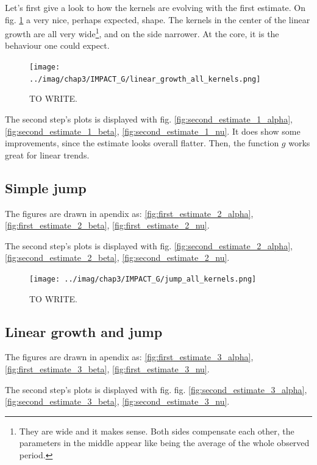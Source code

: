 \documentclass[11pt]{book}
\begin{document}
Let's first give a look to how the kernels are evolving with the first estimate. On fig. \ref{fig:impact_g_linear} a very nice, perhaps expected, shape. The kernels in the center of the linear growth are all very wide\footnote{They are wide and it makes sense. Both sides compensate each other, the parameters in the middle appear like being the average of the whole observed period.}, and on the side narrower. At the core, it is the behaviour one could expect.

\begin{figure}
\centering
\texttt{[image: ../imag/chap3/IMPACT\_G/linear\_growth\_all\_kernels.png]}
\caption{TO WRITE.}
\label{fig:impact_g_linear}
\end{figure}


The second step's plots is displayed with fig. \ref{fig:second_estimate_1_alpha}, \ref{fig:second_estimate_1_beta}, \ref{fig:second_estimate_1_nu}. It does show some improvements, since the estimate looks overall flatter. Then, the function $g$ works great for linear trends.


\subsection{Simple jump}

The figures are drawn in apendix as: \ref{fig:first_estimate_2_alpha}, \ref{fig:first_estimate_2_beta}, \ref{fig:first_estimate_2_nu}.

The second step's plots is displayed with fig. \ref{fig:second_estimate_2_alpha}, \ref{fig:second_estimate_2_beta}, \ref{fig:second_estimate_2_nu}.

\begin{figure}
\centering
\texttt{[image: ../imag/chap3/IMPACT\_G/jump\_all\_kernels.png]}
\caption{TO WRITE.}
\label{fig:impact_g_jump}
\end{figure}



\subsection{Linear growth and jump}
The figures are drawn in apendix as: \ref{fig:first_estimate_3_alpha}, \ref{fig:first_estimate_3_beta}, \ref{fig:first_estimate_3_nu}.

The second step's plots is displayed with fig. fig. \ref{fig:second_estimate_3_alpha}, \ref{fig:second_estimate_3_beta}, \ref{fig:second_estimate_3_nu}.
\end{document}
